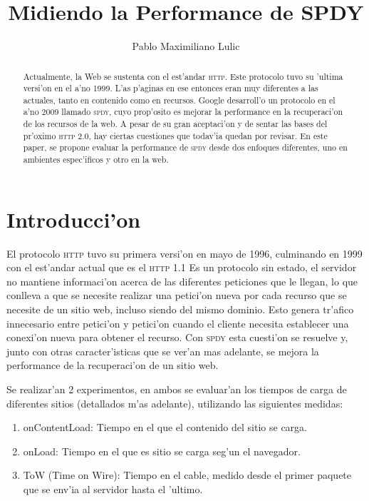\documentclass[a4paper,11pt,twocolumn]{article}
\begin{document}
\setlength{\columnsep}{25pt}

\title{Midiendo la Performance de SPDY}
\author{Pablo Maximiliano Lulic}

\maketitle

\begin{abstract} 
Actualmente, la Web se sustenta con el est'andar \textsc{http}. Este protocolo tuvo su 'ultima versi'on en el a'no 1999. L'as p'aginas en ese entonces eran muy diferentes a las actuales, tanto en contenido como en recursos. Google desarroll'o un protocolo en el a'no 2009 llamado \textsc{spdy}, cuyo prop'osito es mejorar la performance en la recuperaci'on de los recursos de la web. A pesar de su gran aceptaci'on y de sentar las bases del pr'oximo \textsc{http 2.0}, hay ciertas cuestiones que todav'ia quedan por revisar. En este paper, se propone evaluar la performance de \textsc{spdy} desde dos enfoques diferentes, uno en ambientes espec'ificos y otro en la web.
\end{abstract}

\section{Introducci'on}

El protocolo \textsc{http} tuvo su primera versi'on en mayo de 1996, culminando en 1999 con el est'andar actual que es el \textsc{http}  1.1 \cite{rfcHTTP} Es un protocolo sin estado, el servidor no mantiene informaci'on acerca de las diferentes peticiones que le llegan, lo que conlleva a que se necesite realizar una petici'on nueva por cada recurso que se necesite de un sitio web, incluso siendo del mismo dominio. Esto genera tr'afico innecesario entre petici'on y petici'on cuando el cliente necesita establecer una conexi'on nueva para obtener el recurso. Con \textsc{spdy} esta cuesti'on se resuelve y, junto con otras caracter'isticas que se ver'an mas adelante, se mejora la performance de la recuperaci'on de un sitio web.

Se realizar'an 2 experimentos, en ambos se evaluar'an los tiempos de carga de diferentes sitios (detallados m'as adelante), utilizando las siguientes medidas:

\begin{enumerate}
\item onContentLoad: Tiempo en el que el contenido del sitio se carga.
\item onLoad: Tiempo en el que es sitio se carga seg'un el navegador.
\item ToW (Time on Wire): Tiempo en el cable, medido desde el primer paquete que se env'ia al servidor hasta el 'ultimo.
\end{enumerate}
\end{document}
